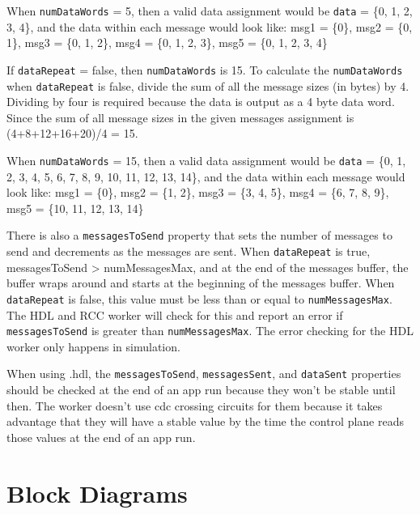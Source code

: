 \begin{flushleft}
When \texttt{numDataWords} = 5, then a valid data assignment would be \texttt{data} = \{0, 1, 2, 3, 4\}, and the data within each message would look like:
msg1 = \{0\}, msg2 = \{0, 1\}, msg3 = \{0, 1, 2\}, msg4 = \{0, 1, 2, 3\}, msg5 = \{0, 1, 2, 3, 4\}  \newline

If \texttt{dataRepeat} = false, then \texttt{numDataWords} is 15. To calculate the \texttt{numDataWords} when \texttt{dataRepeat} is false, divide the sum of all the message sizes (in bytes) by 4. Dividing by four is required because the data is output as a 4 byte data word. Since the sum of all message sizes in the given messages assignment is (4+8+12+16+20)/4 = 15. \newline

When \texttt{numDataWords} = 15, then a valid data assignment would be \texttt{data} = \{0, 1, 2, 3, 4, 5, 6, 7, 8, 9, 10, 11, 12, 13, 14\}, and the data within each message would look like: msg1 = \{0\}, msg2 = \{1, 2\}, msg3 = \{3, 4, 5\}, msg4 = \{6, 7, 8, 9\}, msg5 = \{10, 11, 12, 13, 14\}  \newline

There is also a \texttt{messagesToSend} property that sets the number of messages to send and decrements as the messages are sent. When \texttt{dataRepeat} is true, messagesToSend > numMessagesMax, and at the end of the messages buffer, the buffer wraps around and starts at the beginning of the messages buffer. When \texttt{dataRepeat} is false, this value must be less than or equal to \texttt{numMessagesMax}. The HDL and RCC worker will check for this and report an error if \texttt{messagesToSend} is greater than \texttt{numMessagesMax}. The error checking for the HDL worker only happens in simulation.  \newline

When using {\comp}.hdl, the \texttt{messagesToSend}, \texttt{messagesSent},  and \texttt{dataSent} properties should be checked at the end of an app run because they won't be stable until then. The worker doesn't use cdc crossing circuits for them because it takes advantage that they will have a stable value by the time the control plane reads those values at the end of an app run.


\end{flushleft}

\section*{Block Diagrams}
